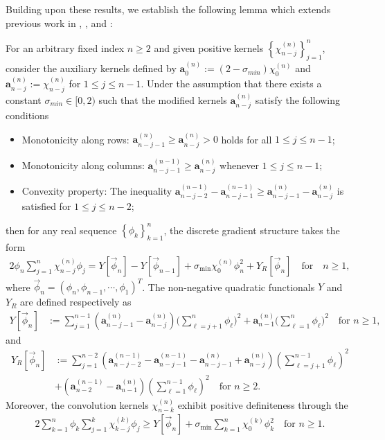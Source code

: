 \documentclass{siamart171218}
\theoremstyle{remark}
\theoremstyle{example}
\numberwithin{equation}{section}
\begin{document}
Building upon these results, we establish the following lemma which extends previous work in \cite{Ji}, \cite{Quan2}, and \cite{Liao2024}:

\begin{lemma}\label{Le.2.4}
For an arbitrary fixed index $n \ge 2$ and given positive kernels $\left\{\chi_{n-j}^{(n)}\right\}_{j=1}^{n}$, consider the auxiliary kernels defined by $\mathbf{a}_{0}^{(n)} := (2 - \sigma_{min}) \chi_{0}^{(n)}$ and
$\mathbf{a}_{n-j}^{(n)} := \chi_{n-j}^{(n)}$ for $1\leq j\leq n-1$. Under the assumption that there exists a constant $\sigma_{min}\in [0, 2)$ such that the modified kernels $\mathbf{a}_{n-j}^{(n)}$ satisfy the following conditions
\begin{itemize}
\item[(1)] Monotonicity along rows:  $\mathbf{a}_{n-j-1}^{(n)} \ge \mathbf{a}_{n-j}^{(n)} > 0$ holds for all  $1\leq j\leq n-1$;
\item[(2)] Monotonicity along columns:  $\mathbf{a}_{n-j-1}^{(n-1)} \ge \mathbf{a}_{n-j}^{(n)}$ whenever $1\leq j\leq n-1$;
\item[(3)] Convexity property: The inequality $\mathbf{a}_{n-j-2}^{(n-1)}-\mathbf{a}_{n-j-1}^{(n-1)} \ge \mathbf{a}_{n-j-1}^{(n)} - \mathbf{a}_{n-j}^{(n)}$ is satisfied for  $1\leq j\leq n-2$;
\end{itemize}
then for any real sequence $\left\{\phi_{k}\right\}_{k=1}^{n}$, the discrete gradient structure takes the form
\begin{align*}
2\phi_n\sum_{j=1}^n\chi_{n-j}^{(n)}\phi_j = Y[\vec{\phi}_n] - Y[\vec{\phi}_{n-1}] + \sigma_{\min}\chi_0^{(n)}\phi_n^2 + Y_R[\vec{\phi}_n]\quad\text{for}\quad n\ge 1,
\end{align*}
where $\vec{\phi}_n = (\phi_n,\phi_{n-1},\cdots,\phi_1)^T$. The non-negative quadratic functionals $Y$ and $Y_R$ are defined respectively as
\begin{align*}
Y[\vec{\phi}_n] &:= \sum_{j=1}^{n-1}\left(\mathbf{a}_{n-j-1}^{(n)} - \mathbf{a}_{n-j}^{(n)}\right)\bigg(\sum_{\ell=j+1}^n \phi_\ell\bigg)^2 + \mathbf{a}_{n-1}^{(n)}\bigg(\sum_{\ell=1}^n \phi_\ell\bigg)^2\quad\text{for } n\ge 1,
\end{align*}
and
\begin{align*}
Y_R[\vec{\phi}_n] &:= \sum_{j=1}^{n-2}\left(\mathbf{a}_{n-j-2}^{(n-1)} - \mathbf{a}_{n-j-1}^{(n-1)} - \mathbf{a}_{n-j-1}^{(n)} + \mathbf{a}_{n-j}^{(n)}\right)\left(\sum_{\ell=j+1}^{n-1}\phi_\ell\right)^2\\&
 +\left(\mathbf{a}_{n-2}^{(n-1)} - \mathbf{a}_{n-1}^{(n)}\right)
 \left(\sum_{\ell=1}^{n-1} \phi_\ell\right)^2\quad\text{for } n\ge 2.
\end{align*}
Moreover, the convolution kernels $\chi_{n-k}^{(n)}$ exhibit positive definiteness through the
\begin{align*}
  2 \sum_{k=1}^n \phi_k \sum_{j=1}^k \chi_{k-j}^{(k)} \phi_j \ge Y[\vec{\phi}_n] + \sigma_{\min} \sum_{k=1}^n \chi_0^{(k)} \phi_k^2 \quad \text{for } n\ge 1.
\end{align*}
\end{lemma}
\end{document}
